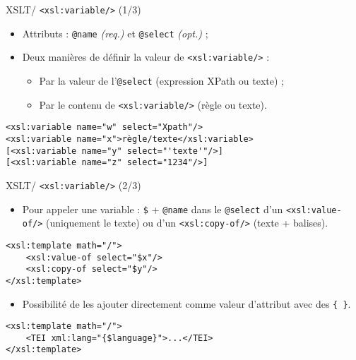 \documentclass{beamer}
\begin{document}
    \begin{frame}[fragile]{XSLT/ \texttt{<xsl:variable/>} (1/3)}
        \Large
        \begin{itemize}
            \item Attributs : \texttt{@name} \textit{(req.)} et \texttt{@select} \textit{(opt.)} ;
            \bigskip
            \item Deux manières de définir la valeur de \texttt{<xsl:variable/>} :
            \begin{itemize}
            \Large
                \item Par la valeur de l'\texttt{@select} (expression XPath ou texte) ;
                \item Par le contenu de \texttt{<xsl:variable/>} (règle ou texte).
            \end{itemize}
        \end{itemize}
        \normalsize
        \begin{verbatim}
<xsl:variable name="w" select="Xpath"/>
<xsl:variable name="x">règle/texte</xsl:variable>
[<xsl:variable name="y" select="'texte'"/>]
[<xsl:variable name="z" select="1234"/>]
        \end{verbatim}
    \end{frame}

    \begin{frame}[fragile]{XSLT/ \texttt{<xsl:variable/>} (2/3)}
        \large
        \begin{itemize}
            \item  Pour appeler une variable : \texttt{\$} + \texttt{@name} dans le \texttt{@select} d'un \texttt{<xsl:value-of/>} (uniquement le texte) ou d'un \texttt{<xsl:copy-of/>} (texte + balises).
        \end{itemize}
        \begin{verbatim}
<xsl:template math="/">
    <xsl:value-of select="$x"/>
    <xsl:copy-of select="$y"/>
</xsl:template>
        \end{verbatim}
        \begin{itemize}
            \item  Possibilité de les ajouter directement comme valeur d'attribut avec des \texttt{\{ \}}.
        \end{itemize}
        \large
        \begin{verbatim}
<xsl:template math="/">
    <TEI xml:lang="{$language}">...</TEI>
</xsl:template>
        \end{verbatim}
    \end{frame}
\end{document}
